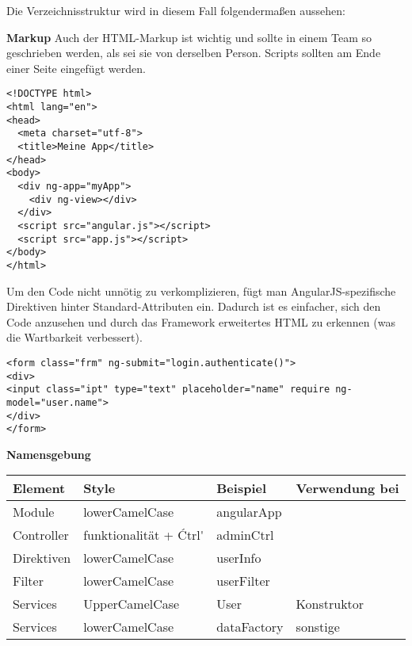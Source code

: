 Die Verzeichnisstruktur wird in diesem Fall folgendermaßen aussehen:\newline


\clearpage

\textbf{Markup\newline}
Auch der HTML-Markup ist wichtig und sollte in einem Team so geschrieben werden, als sei sie von derselben Person. Scripts sollten am Ende einer Seite eingefügt werden.

\begin{lstlisting}
<!DOCTYPE html>
<html lang="en">
<head>
  <meta charset="utf-8">
  <title>Meine App</title>
</head>
<body>
  <div ng-app="myApp">
    <div ng-view></div>
  </div>
  <script src="angular.js"></script>
  <script src="app.js"></script>
</body>
</html>
\end{lstlisting}


Um den Code nicht unnötig zu verkomplizieren, fügt man AngularJS-spezifische Direktiven hinter Standard-Attributen ein. Dadurch ist es einfacher, sich den Code anzusehen und durch das Framework erweitertes HTML zu erkennen (was die Wartbarkeit verbessert).

\begin{lstlisting}
<form class="frm" ng-submit="login.authenticate()">
<div>
<input class="ipt" type="text" placeholder="name" require ng-model="user.name">
</div>
</form>
\end{lstlisting}


\textbf{Namensgebung\newline}

\begin{tabular}{|l|l|l|l|}
\hline
\textbf{Element} & \textbf{Style} & \textbf{Beispiel} & \textbf{Verwendung bei} \\ \hline
Module & lowerCamelCase & angularApp &  \\ \hline
Controller & funktionalität + \'Ctrl\' & adminCtrl &  \\ \hline
Direktiven & lowerCamelCase & userInfo &  \\ \hline
Filter & lowerCamelCase & userFilter &  \\ \hline
Services & UpperCamelCase & User & Konstruktor \\ \hline
Services & lowerCamelCase & dataFactory & sonstige \\ \hline
\end{tabular}

